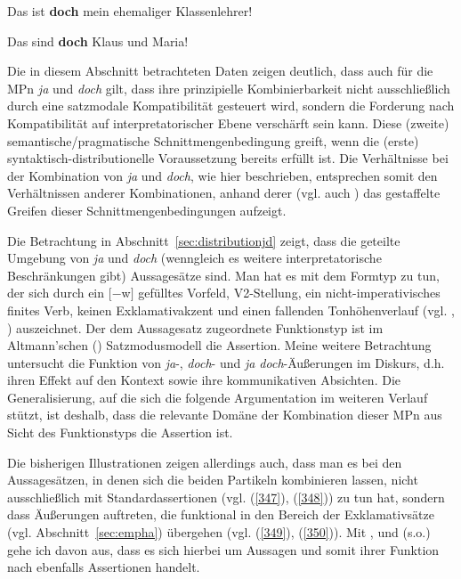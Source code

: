 \begin{exe}
	\ex\label{345} 
	Das ist \textbf{doch} mein ehemaliger Klassenlehrer!
	\hfill\hbox {\citet[196]{Rinas2006}}
\end{exe}
\vspace{-0.65cm}
\begin{exe}
	\ex\label{346} 
	Das sind \textbf{doch} Klaus und Maria!	
	\hfill\hbox {\citet[86]{Dahl1988}}
\end{exe}											         
Die in diesem Abschnitt betrachteten Daten zeigen deutlich, dass auch für die MPn \textit{ja} und \textit{doch} gilt, dass ihre prinzipielle Kombinierbarkeit nicht ausschließlich durch eine satzmodale Kompatibilität gesteuert wird, sondern die Forderung nach Kompatibilität auf interpretatorischer Ebene verschärft sein kann. Diese (zweite) semantische/pragmatische Schnittmengenbedingung greift, wenn die (erste) syn\-taktisch-distributionelle Voraussetzung bereits erfüllt ist. Die Verhältnisse bei der Kombination von \textit{ja} und \textit{doch}, wie hier beschrieben, entsprechen somit den Verhältnissen anderer Kombinationen, anhand derer \citet[26-27]{Thurmair1991} (vgl. auch \citealt[Kapitel 3]{Thurmair1989}) das gestaffelte Greifen dieser Schnittmengenbedingungen aufzeigt. 

Die Betrachtung in Abschnitt~\ref{sec:distributionjd} zeigt, dass die geteilte Umgebung von \textit{ja} und \textit{doch} (wenngleich es weitere interpretatorische Beschrän\-kungen gibt) Aussagesätze sind. Man hat es mit dem Formtyp zu tun, der sich durch ein $[\minus$w$]$ gefülltes Vorfeld, V2-Stellung, ein nicht-imperativisches finites Verb, keinen Exklamativakzent und einen fallenden Tonhöhenverlauf (vgl. \citealt[44]{Thurmair1989}, \citealt[176-177]{Oppenrieder1987}) auszeichnet. Der dem Aussagesatz zugeordnete Funktionstyp ist im Altmann'schen (\citeyear{Altmann1984, Altmann1987}) Satzmodusmodell die Assertion. Meine weitere Betrachtung untersucht die Funktion von \textit{ja}-, \textit{doch}- und \textit{ja doch}-Äußerun\-gen im Diskurs, d.h. ihren Effekt auf den Kontext sowie ihre kommunikativen Absichten. Die Generalisierung, auf die sich die folgende Argumentation im weiteren Verlauf stützt, ist deshalb, dass die relevante Domäne der Kombination dieser MPn aus Sicht des Funktionstyps die Assertion  ist.

Die bisherigen Illustrationen zeigen allerdings auch, dass man es bei den Aussagesätzen, in denen sich die beiden Partikeln kombinieren lassen, nicht aus\-schließlich mit Standardassertionen (vgl. (\ref{347}), (\ref{348})) zu tun hat, sondern dass Äuße\-rungen auftreten, die funktional in den Bereich der Exklamativsätze (vgl. Abschnitt~\ref{sec:empha}) übergehen (vgl. (\ref{349}), (\ref{350})). Mit \citet[77-80]{Doherty1985}, \citet[107-108]{Thurmair1989} und \citet[37]{Kwon2005} (s.o.) gehe ich davon aus, dass es sich hierbei um Aussagen und somit ihrer Funktion nach ebenfalls Assertionen handelt.

